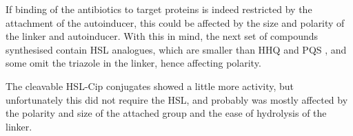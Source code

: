 If binding of the antibiotics to target proteins is indeed restricted by the attachment of the autoinducer, this could be affected by the size and polarity of the linker and autoinducer. With this in mind, the next set of compounds synthesised contain HSL analogues, which are smaller than HHQ  and PQS , and some omit the triazole in the linker, hence affecting polarity.

The cleavable HSL-Cip conjugates showed a little more activity, but unfortunately this did not require the HSL, and probably was mostly affected by the polarity and size of the attached group and the ease of hydrolysis of the linker.